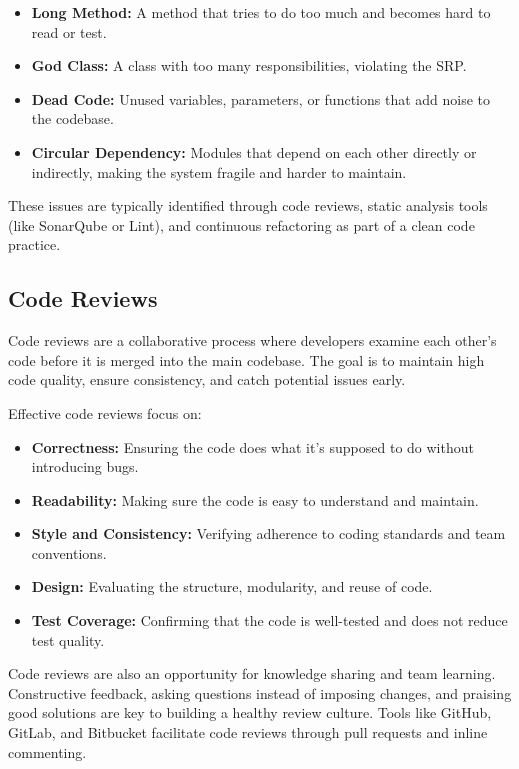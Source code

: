 \documentclass[a4paper,12pt]{article}
\begin{document}
\begin{itemize}
  \item \textbf{Long Method:} A method that tries to do too much and becomes hard to read or test.
  \item \textbf{God Class:} A class with too many responsibilities, violating the SRP.
  \item \textbf{Dead Code:} Unused variables, parameters, or functions that add noise to the codebase.
  \item \textbf{Circular Dependency:} Modules that depend on each other directly or indirectly, making the system fragile and harder to maintain.
\end{itemize}

These issues are typically identified through code reviews, static analysis tools (like SonarQube or Lint), and continuous refactoring as part of a clean code practice.

\subsection{Code Reviews}

Code reviews are a collaborative process where developers examine each other's code before it is merged into the main codebase. The goal is to maintain high code quality, ensure consistency, and catch potential issues early.

Effective code reviews focus on:
\begin{itemize}
  \item \textbf{Correctness:} Ensuring the code does what it's supposed to do without introducing bugs.
  \item \textbf{Readability:} Making sure the code is easy to understand and maintain.
  \item \textbf{Style and Consistency:} Verifying adherence to coding standards and team conventions.
  \item \textbf{Design:} Evaluating the structure, modularity, and reuse of code.
  \item \textbf{Test Coverage:} Confirming that the code is well-tested and does not reduce test quality.
\end{itemize}

Code reviews are also an opportunity for knowledge sharing and team learning. Constructive feedback, asking questions instead of imposing changes, and praising good solutions are key to building a healthy review culture. Tools like GitHub, GitLab, and Bitbucket facilitate code reviews through pull requests and inline commenting.
\end{document}
